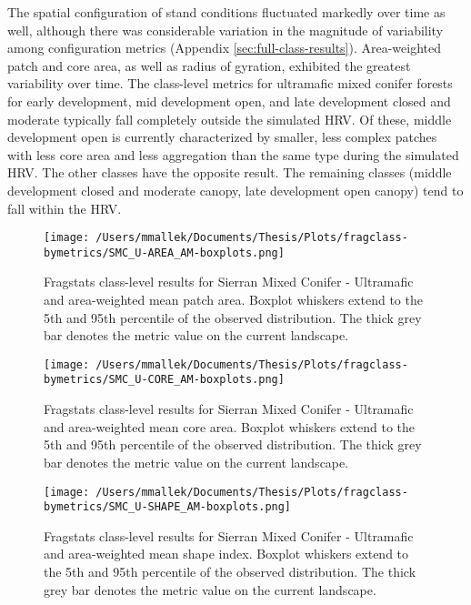 The spatial configuration of stand conditions fluctuated markedly over time as well, although there was considerable variation in the magnitude of variability among configuration metrics (Appendix \ref{sec:full-class-results}). Area-weighted patch and core area, as well as radius of gyration, exhibited the greatest variability over time. The class-level metrics for ultramafic mixed conifer forests for early development, mid development open, and late development closed and moderate typically fall completely outside the simulated HRV. Of these, middle development open is currently characterized by smaller, less complex patches with less core area and less aggregation than the same type during the simulated HRV. The other classes have the opposite result. The remaining classes (middle development closed and moderate canopy, late development open canopy) tend to fall within the HRV.


\begin{figure}[!htbp]
\centering
    \texttt{[image: /Users/mmallek/Documents/Thesis/Plots/fragclass-bymetrics/SMC\_U-AREA\_AM-boxplots.png]}
  \caption{Fragstats class-level results for Sierran Mixed Conifer - Ultramafic and area-weighted mean patch area. Boxplot whiskers extend to the 5th and 95th percentile of the observed distribution. The thick grey bar denotes the metric value on the current landscape.}
  \label{fig:smcu_areaam}
\end{figure}


\begin{figure}[!htbp]
\centering
    \texttt{[image: /Users/mmallek/Documents/Thesis/Plots/fragclass-bymetrics/SMC\_U-CORE\_AM-boxplots.png]}
  \caption{Fragstats class-level results for Sierran Mixed Conifer - Ultramafic and area-weighted mean core area. Boxplot whiskers extend to the 5th and 95th percentile of the observed distribution. The thick grey bar denotes the metric value on the current landscape.}
  \label{fig:smcu_coream}
\end{figure}


\begin{figure}[!htbp]
\centering
    \texttt{[image: /Users/mmallek/Documents/Thesis/Plots/fragclass-bymetrics/SMC\_U-SHAPE\_AM-boxplots.png]}
  \caption{Fragstats class-level results for Sierran Mixed Conifer - Ultramafic and area-weighted mean shape index. Boxplot whiskers extend to the 5th and 95th percentile of the observed distribution. The thick grey bar denotes the metric value on the current landscape.}
  \label{fig:smcu_shapeam}
\end{figure}


